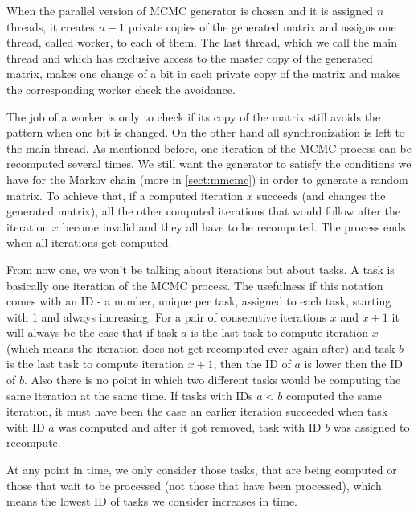 When the parallel version of MCMC generator is chosen and it is assigned $n$ threads, it creates $n-1$ private copies of the generated matrix and assigns one thread, called worker, to each of them. The last thread, which we call the main thread and which has exclusive access to the master copy of the generated matrix, makes one change of a bit in each private copy of the matrix and makes the corresponding worker check the avoidance.

The job of a worker is only to check if its copy of the matrix still avoids the pattern when one bit is changed. On the other hand all synchronization is left to the main thread. As mentioned before, one iteration of the MCMC process can be recomputed several times. We still want the generator to satisfy the conditions we have for the Markov chain (more in \autoref{sect:mmcmc}) in order to generate a random matrix. To achieve that, if a computed iteration $x$ succeeds (and changes the generated matrix), all the other computed iterations that would follow after the iteration $x$ become invalid and they all have to be recomputed. The process ends when all iterations get computed.

From now one, we won't be talking about iterations but about tasks. A task is basically one iteration of the MCMC process. The usefulness if this notation comes with an ID - a number, unique per task, assigned to each task, starting with 1 and always increasing. For a pair of consecutive iterations $x$ and $x+1$ it will always be the case that if task $a$ is the last task to compute iteration $x$ (which means the iteration does not get recomputed ever again after) and task $b$ is the last task to compute iteration $x+1$, then the ID of $a$ is lower then the ID of $b$. Also there is no point in which two different tasks would be computing the same iteration at the same time. If tasks with IDs $a<b$ computed the same iteration, it must have been the case an earlier iteration succeeded when task with ID $a$ was computed and after it got removed, task with ID $b$ was assigned to recompute.

At any point in time, we only consider those tasks, that are being computed or those that wait to be processed (not those that have been processed), which means the lowest ID of tasks we consider increases in time.

